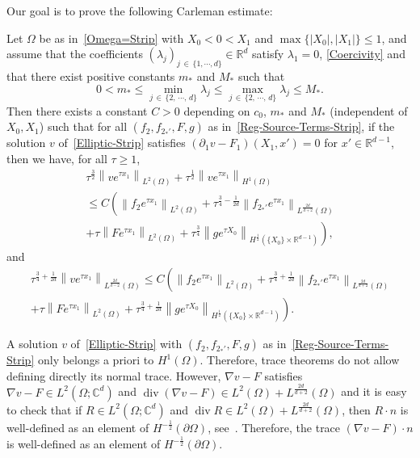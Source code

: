 \documentclass[AHL,Unicode,longabstracts]{cedram}
\newcommand*\R{\mathbb{R}}
\newcommand*\C{\mathbb{C}}
\renewcommand{\leq}{\leqslant}
\renewcommand{\geq}{\geqslant}
\renewcommand{\div}{\operatorname{div}}
\begin{document}
Our goal is to prove the following Carleman estimate:
\begin{theo}\label{Thm-Carleman-Strip}
Let $\Omega$ be as in~\eqref{Omega=Strip} with $X_0 \! <\! 0\! <\! X_1$ and $\max\{|X_0|, |X_1|\} \leq 1$, and assume that the coefficients $(\lambda_j)_{j\,\in\,\{1,\cdots,d\}} \in \R^d$ satisfy $\lambda_1 = 0$, \eqref{Coercivity} and that there exist positive constants $m_*$ and $M_*$ such that
\begin{equation}\label{Sub-ellipticity-Strip}
0< m_*\leq \min_{j\,\in\,\{2,\, \cdots,\, d\}} \lambda_j
\leq \max_{j\,\in\,\{2,\, \cdots,\, d\}} \lambda_j \leq M_*.
\end{equation}
Then there exists a constant $C>0$ depending on $c_0$, $m_*$ and $M_*$ (independent of $X_0, X_1$) such that for all $(f_2, f_{2_*'},F,g)$ as in~\eqref{Reg-Source-Terms-Strip}, if the solution $v$ of~\eqref{Elliptic-Strip} satisfies $(\partial_1 v-F_1) (X_1, x') = 0$ for $x' \in \R^{d-1}$, then we have, for all $\tau \geq 1$,
\begin{multline}\label{Carleman-Strip-1}
\tau^{\frac{3}{2}} \left\| v e^{ \tau x_1}\right\|_{L^2(\Omega)} +
\tau^{\frac{1}{2}} \left\| v e^{\tau x_1} \right\|_{H^1(\Omega)}\\
\leq C\left(
\left\| f_2 e^{\tau x_1} \right\|_{L^2(\Omega)} +
\tau^{\frac{3}{4}-\frac{1}{2d}} \left\| f_{2_*'} e^{\tau x_1} \right\|_{L^{\frac{2d}{d+2}}(\Omega)}
\right.
\\
\left. +
\tau \left\| F e^{\tau x_1} \right\|_{L^2(\Omega)} +
\tau^{\frac{3}{4}} \left\| g e^{\tau X_0} \right\|_{H^{\frac{1}{2}}\left(\{X_0\} \times \R^{d-1}\right)}
\right),
\end{multline}
and
\begin{multline}\label{Carleman-Strip-2}
\tau^{\frac{3}{4}+\frac{1}{2d}} \left\| v e^{\tau x_1}\right\|_{L^{\frac{2d}{d-2}}(\Omega)}
\leq C\left(
\left\| f_2 e^{\tau x_1} \right\|_{L^2(\Omega)} +
\tau^{\frac{3}{4}+\frac{1}{2d}} \left\| f_{2_*'} e^{\tau x_1} \right\|_{L^{\frac{2d}{d+2}}(\Omega)}
\right.
\\
\left. +
\tau \left\| F e^{\tau x_1} \right\|_{L^2(\Omega)} +
\tau^{\frac{3}{4}+\frac{1}{2d}} \left\| g e^{\tau X_0} \right\|_{H^{\frac{1}{2}}\left(\{X_0\} \times \R^{d-1}\right)}
\right).
\end{multline}
\end{theo}

\begin{rema}
A solution $v$ of~\eqref{Elliptic-Strip} with $(f_2, f_{2_*'},F,g)$ as in~\eqref{Reg-Source-Terms-Strip} only belongs a priori to $H^1(\Omega)$. Therefore, trace theorems do not allow defining directly its normal trace. However, $\nabla v - F$ satisfies $\nabla v - F \in L^2(\Omega; \C^d)$ and $\div (\nabla v - F) \in L^2(\Omega) + L^{\frac{2d}{d+2}}(\Omega)$ and it is easy to check that if $R \in L^2(\Omega; \C^d)$ and $\div R \in L^2(\Omega) + L^{\frac{2d}{d+2}}(\Omega)$, then $R \cdot n$ is well-defined as an element of $H^{-\frac{1}{2}}(\partial \Omega)$, see~\cite[Theorem~III.2.43]{Boyer-Fabrie-Book}. Therefore, the trace $(\nabla v - F)\cdot n$ is well-defined as an element of $H^{-\frac{1}{2}}(\partial \Omega)$.
\end{rema}
\end{document}
